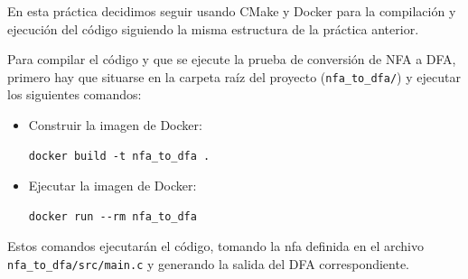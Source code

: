 \documentclass[12pt, letterpaper]{article}
\begin{document}
\noindent En esta práctica decidimos seguir usando CMake y Docker para la compilación y ejecución del código siguiendo la misma estructura de la práctica anterior.

\noindent Para compilar el código y que se ejecute la prueba de conversión de NFA a DFA, primero hay que situarse en la carpeta 
raíz del proyecto (\texttt{nfa\_to\_dfa/}) y ejecutar los siguientes comandos:
\begin{itemize}
    \item Construir la imagen de Docker:
    \begin{lstlisting}[style=bashstyle]
docker build -t nfa_to_dfa .
    \end{lstlisting}
    \item Ejecutar la imagen de Docker:
    \begin{lstlisting}[style=bashstyle]
docker run --rm nfa_to_dfa
    \end{lstlisting}
\end{itemize}
Estos comandos ejecutarán el código, tomando la nfa definida en el archivo \texttt{nfa\_to\_dfa/src/main.c} y generando la salida del DFA correspondiente.
\end{document}
